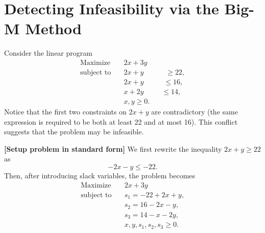 %
%


\section*{Detecting Infeasibility via the Big-M Method}

Consider the linear program
\[
\begin{aligned}
\text{Maximize}\quad & 2x + 3y \\
\text{subject to}\quad & 2x + y \;\;\;\;\;\;\;\;\;\;\; \geq 22, \\
& 2x + y \;\;\;\;\;\;\;\;\;\; \leq 16, \\
& x + 2y \;\;\;\;\;\;\;\;\; \leq 14, \\
& x, y \geq 0.
\end{aligned}
\]
Notice that the first two constraints on \(2x+y\) are contradictory (the same expression is required to be both at least 22 and at most 16). This conflict suggests that the problem may be infeasible. 

\textbf{[Setup problem in standard form]} We first rewrite the inequality \(2x+y \ge 22\) as 
\[
-2x - y \le -22.
\]
Then, after introducing slack variables, the problem becomes
\[
\begin{aligned}
\text{Maximize}\quad & 2x + 3y \\
\text{subject to}\quad & s_1 = -22 + 2x + y,\\[1mm]
& s_2 = 16 - 2x - y,\\[1mm]
& s_3 = 14 - x - 2y,\\[1mm]
& x, y, s_1, s_2, s_3 \geq 0.
\end{aligned}
\]

